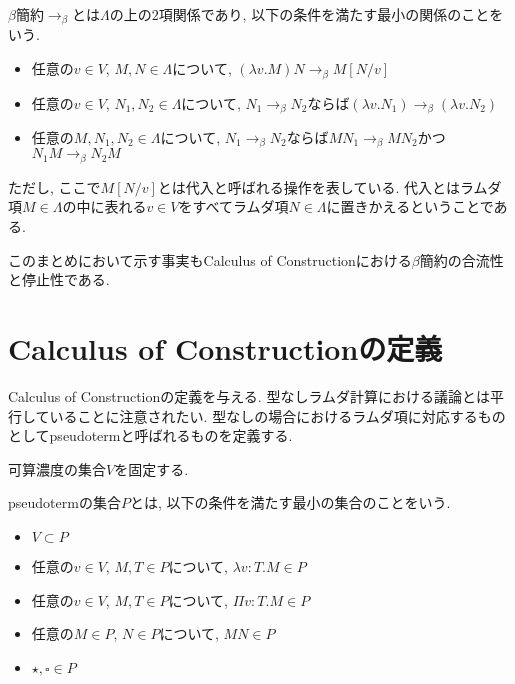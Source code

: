 \documentclass{ltjsarticle}
\begin{document}
\begin{defn}
 $\beta$簡約$\rightarrow_{\beta}$とは$\Lambda$の上の$2$項関係であり, 以下の条件を満たす最小の関係のことをいう.
 \begin{itemize}
  \item 任意の$v \in V$, $M, N \in \Lambda$について, $(\lambda v. M) N \rightarrow_\beta M[N/v]$
  \item 任意の$v \in V$, $N_1, N_2 \in \Lambda$について, $N_1 \rightarrow_\beta N_2$ならば$(\lambda v. N_1) \rightarrow_\beta (\lambda v. N_2)$
  \item 任意の$M, N_1, N_2 \in \Lambda$について, $N_1 \rightarrow_\beta N_2$ならば$M N_1 \rightarrow_\beta M N_2$かつ$N_1 M \rightarrow_\beta N_2 M$
 \end{itemize}
 ただし, ここで$M[N/v]$とは代入と呼ばれる操作を表している. 代入とはラムダ項$M \in \Lambda$の中に表れる$v \in V$をすべてラムダ項$N \in \Lambda$に置きかえるということである.
\end{defn}

このまとめにおいて示す事実もCalculus of Constructionにおける$\beta$簡約の合流性と停止性である.

\section{Calculus of Constructionの定義}
Calculus of Constructionの定義を与える. 型なしラムダ計算における議論とは平行していることに注意されたい.
型なしの場合におけるラムダ項に対応するものとしてpseudotermと呼ばれるものを定義する.

可算濃度の集合$V$を固定する.

\begin{defn}
 pseudotermの集合$P$とは, 以下の条件を満たす最小の集合のことをいう.
 \begin{itemize}
  \item $V \subset P$
  \item 任意の$v \in V$, $M, T \in P$について, $\lambda v \colon T. M \in P$
  \item 任意の$v \in V$, $M, T \in P$について, $\Pi v \colon T. M \in P$
  \item 任意の$M \in P$, $N \in P$について, $M N \in P$
  \item $ \star, \square \in P$
 \end{itemize}
\end{defn}
\end{document}
